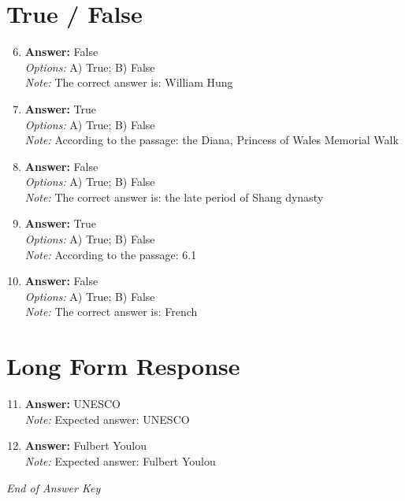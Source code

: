 \documentclass[12pt]{article}
\begin{document}
\section*{True / False}
\begin{enumerate}[label=\arabic*.]
\setcounter{enumi}{5}
\item \textbf{Answer:} False
\\ \textit{Options:} A) True; B) False
\\ \textit{Note:} The correct answer is: William Hung
\item \textbf{Answer:} True
\\ \textit{Options:} A) True; B) False
\\ \textit{Note:} According to the passage: the Diana, Princess of Wales Memorial Walk
\item \textbf{Answer:} False
\\ \textit{Options:} A) True; B) False
\\ \textit{Note:} The correct answer is: the late period of Shang dynasty
\item \textbf{Answer:} True
\\ \textit{Options:} A) True; B) False
\\ \textit{Note:} According to the passage: 6.1
\item \textbf{Answer:} False
\\ \textit{Options:} A) True; B) False
\\ \textit{Note:} The correct answer is: French
\end{enumerate}

\section*{Long Form Response}
\begin{enumerate}[label=\arabic*.]
\setcounter{enumi}{10}
\item \textbf{Answer:} UNESCO
\\ \textit{Note:} Expected answer: UNESCO
\item \textbf{Answer:} Fulbert Youlou
\\ \textit{Note:} Expected answer: Fulbert Youlou
\end{enumerate}

\vfill
\noindent\textit{End of Answer Key}
\end{document}
